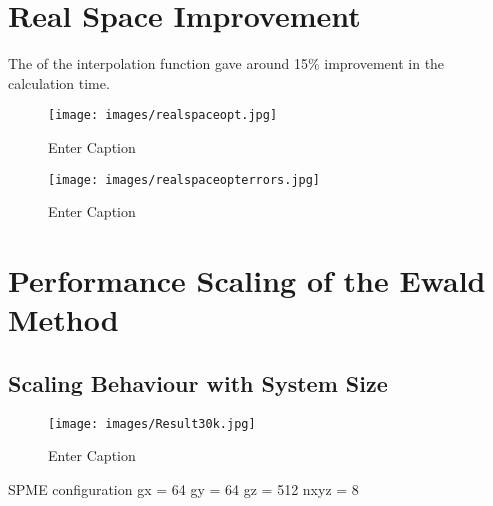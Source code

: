 \section{Real Space Improvement}
The of the interpolation function gave around 15\% improvement in the calculation time. 
\begin{figure}[H]
    \centering
    \texttt{[image: images/realspaceopt.jpg]}
    \caption{Enter Caption}
    \label{fig:enter-label}
\end{figure}
\begin{figure}[H]
    \centering
    \texttt{[image: images/realspaceopterrors.jpg]}
    \caption{Enter Caption}
    \label{fig:enter-label}
\end{figure}
\section{Performance Scaling of the Ewald Method}
\subsection{Scaling Behaviour with System Size}
\begin{figure}[H]
    \centering
    \texttt{[image: images/Result30k.jpg]}
    \caption{Enter Caption}
    \label{fig:enter-label}
\end{figure}
SPME configuration
gx = 64 
gy = 64
gz = 512
nxyz = 8

